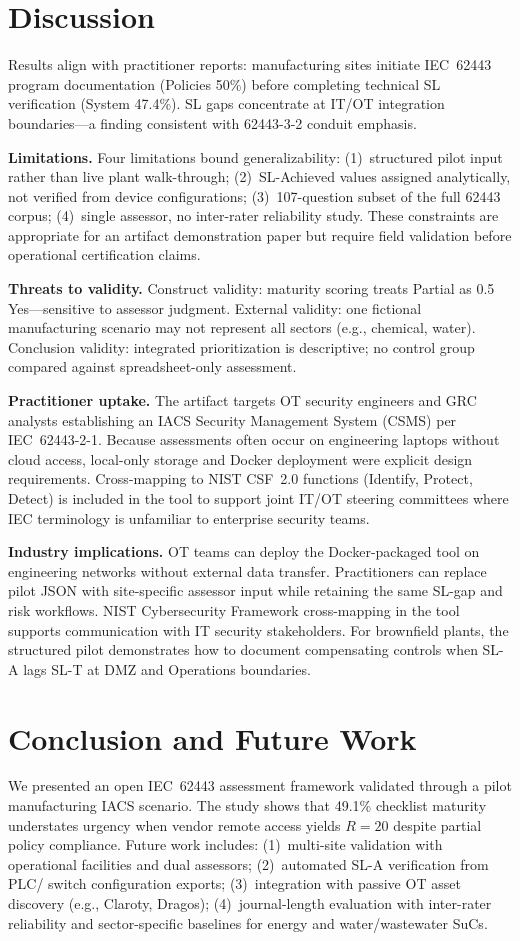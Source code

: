 \documentclass[10pt,conference]{IEEEtran}
\begin{document}
\section{Discussion}
Results align with practitioner reports: manufacturing sites initiate IEC~62443 program documentation (Policies 50\%) before completing technical SL verification (System 47.4\%). SL gaps concentrate at IT/OT integration boundaries---a finding consistent with 62443-3-2 conduit emphasis.

\textbf{Limitations.} Four limitations bound generalizability: (1)~structured pilot input rather than live plant walk-through; (2)~SL-Achieved values assigned analytically, not verified from device configurations; (3)~107-question subset of the full 62443 corpus; (4)~single assessor, no inter-rater reliability study. These constraints are appropriate for an artifact demonstration paper but require field validation before operational certification claims.

\textbf{Threats to validity.} Construct validity: maturity scoring treats Partial as 0.5 Yes---sensitive to assessor judgment. External validity: one fictional manufacturing scenario may not represent all sectors (e.g., chemical, water). Conclusion validity: integrated prioritization is descriptive; no control group compared against spreadsheet-only assessment.

\textbf{Practitioner uptake.} The artifact targets OT security engineers and GRC analysts establishing an IACS Security Management System (CSMS) per IEC~62443-2-1. Because assessments often occur on engineering laptops without cloud access, local-only storage and Docker deployment were explicit design requirements. Cross-mapping to NIST CSF~2.0 functions (Identify, Protect, Detect) is included in the tool to support joint IT/OT steering committees where IEC terminology is unfamiliar to enterprise security teams.

\textbf{Industry implications.} OT teams can deploy the Docker-packaged tool on engineering networks without external data transfer. Practitioners can replace pilot JSON with site-specific assessor input while retaining the same SL-gap and risk workflows. NIST Cybersecurity Framework cross-mapping in the tool supports communication with IT security stakeholders. For brownfield plants, the structured pilot demonstrates how to document compensating controls when SL-A lags SL-T at DMZ and Operations boundaries.

\section{Conclusion and Future Work}
We presented an open IEC~62443 assessment framework validated through a pilot manufacturing IACS scenario. The study shows that 49.1\% checklist maturity understates urgency when vendor remote access yields $R=20$ despite partial policy compliance. Future work includes: (1)~multi-site validation with operational facilities and dual assessors; (2)~automated SL-A verification from PLC/ switch configuration exports; (3)~integration with passive OT asset discovery (e.g., Claroty, Dragos); (4)~journal-length evaluation with inter-rater reliability and sector-specific baselines for energy and water/wastewater SuCs.
\end{document}
